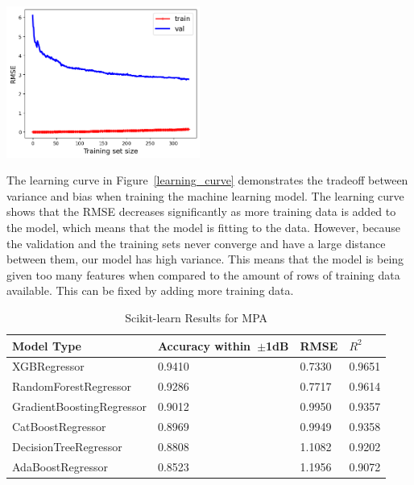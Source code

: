 \documentclass[conference]{IEEEtran}
\newenvironment{Figure}
    {\par\medskip\noindent\minipage{\linewidth}}
    {\endminipage\par\medskip}
\begin{document}
\begin{Figure}
    \centering
    \includegraphics[width=2.5in]{images/learningcurve1.png}
    \label{learning_curve}
\end{Figure}

The learning curve in Figure~\ref{learning_curve} demonstrates the tradeoff between variance and bias when training the machine learning model. The learning curve shows that the RMSE decreases significantly as more training data is added to the model, which means that the model is fitting to the data. However, because the validation and the training sets never converge and have a large distance between them, our model has high variance. This means that the model is being given too many features when compared to the amount of rows of training data available. This can be fixed by adding more training data.


\begin{table}[h]
\caption{Scikit-learn Results for MPA}
\begin{center}
\begin{tabular}{ |l|l|l|l| }
    \hline
    Model Type & Accuracy within~$\pm$1dB & RMSE & $R^2$ \\ 
    \hline
    XGBRegressor & 0.9410 & 0.7330 & 0.9651 \\  
    \hline
    RandomForestRegressor & 0.9286 & 0.7717 & 0.9614 \\
    \hline  
    GradientBoostingRegressor & 0.9012 & 0.9950 & 0.9357 \\
    \hline
    CatBoostRegressor & 0.8969 & 0.9949 & 0.9358 \\    
    \hline
    DecisionTreeRegressor & 0.8808 & 1.1082 & 0.9202 \\  
    \hline
    AdaBoostRegressor & 0.8523 & 1.1956 & 0.9072 \\  
    \hline
\end{tabular}
\end{center}
\label{comparing_sklearn_p}
\end{table}
\end{document}
